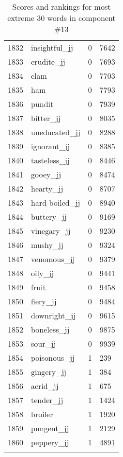 \begin{longtable}[!htbp]{| rlr@{.}l |}
    1832 & insightful\_jj & 0 & 7642 \\
    1833 & erudite\_jj & 0 & 7693 \\
    1834 & clam & 0 & 7703 \\
    1835 & ham & 0 & 7793 \\
    1836 & pundit & 0 & 7939 \\
    1837 & bitter\_jj & 0 & 8035 \\
    1838 & uneducated\_jj & 0 & 8288 \\
    1839 & ignorant\_jj & 0 & 8385 \\
    1840 & tasteless\_jj & 0 & 8446 \\
    1841 & gooey\_jj & 0 & 8474 \\
    1842 & hearty\_jj & 0 & 8707 \\
    1843 & hard-boiled\_jj & 0 & 8940 \\
    1844 & buttery\_jj & 0 & 9169 \\
    1845 & vinegary\_jj & 0 & 9230 \\
    1846 & mushy\_jj & 0 & 9324 \\
    1847 & venomous\_jj & 0 & 9379 \\
    1848 & oily\_jj & 0 & 9441 \\
    1849 & fruit & 0 & 9458 \\
    1850 & fiery\_jj & 0 & 9484 \\
    1851 & downright\_jj & 0 & 9615 \\
    1852 & boneless\_jj & 0 & 9875 \\
    1853 & sour\_jj & 0 & 9939 \\
    1854 & poisonous\_jj & 1 & 239 \\
    1855 & gingery\_jj & 1 & 384 \\
    1856 & acrid\_jj & 1 & 675 \\
    1857 & tender\_jj & 1 & 1424 \\
    1858 & broiler & 1 & 1920 \\
    1859 & pungent\_jj & 1 & 2129 \\
    1860 & peppery\_jj & 1 & 4891 \\
    \hline
    \caption{Scores and rankings for most extreme 30 words in component \#13} \\
\end{longtable}
